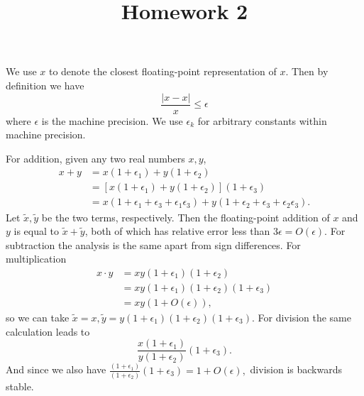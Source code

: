 \documentclass{homework}
\title{Homework 2}
\begin{document}
\maketitle

\begin{problem}
We use \(\boxed x\) to denote the closest
floating-point representation of \(x\). Then
by definition we have
\[\frac{\left|\boxed{x} - x\right|}{x} \le \epsilon\]
where \(\epsilon\) is the machine precision.
We use \(\epsilon_k\) for arbitrary constants within
machine precision.

For addition, given any two real numbers \(x,y\),
\[\begin{aligned}
  \boxed{\boxed x + \boxed y}
&= \boxed{x(1+\epsilon_1) + y(1+\epsilon_2)}\\
&= \left[x(1 + \epsilon_1) + y(1 + \epsilon_2)\right](1+\epsilon_3)\\
&= x(1 + \epsilon_1 + \epsilon_3 + \epsilon_1\epsilon_3)
+ y(1 + \epsilon_2 + \epsilon_3 + \epsilon_2\epsilon_3).
\end{aligned}\]
Let \(\tilde x, \tilde y\) be the two terms, respectively.
Then the floating-point addition of \(x\) and \(y\)
is equal to \(\tilde x + \tilde y\), both of which
has relative error less than \(3\epsilon = O(\epsilon)\).
For subtraction the analysis is the same apart from
sign differences. For multiplication
\[\begin{aligned}
  \boxed{\boxed x \cdot \boxed y}
&= \boxed{xy(1+\epsilon_1)(1+\epsilon_2)}\\
&= xy(1+\epsilon_1)(1+\epsilon_2)(1+\epsilon_3)\\
&= xy(1 + O(\epsilon)),
\end{aligned}\]
so we can take \(\tilde x = x, \tilde y =
y(1+\epsilon_1)(1+\epsilon_2)(1+\epsilon_3)\).
For division the same calculation leads to
\[\frac{x(1+\epsilon_1)}{y(1+\epsilon_2)}(1+\epsilon_3).\]
And since we also have
\(\frac{(1+\epsilon_1)}{(1+\epsilon_2)}(1+\epsilon_3) = 1+O(\epsilon),\)
division is backwards stable.
\end{problem}
\end{document}
